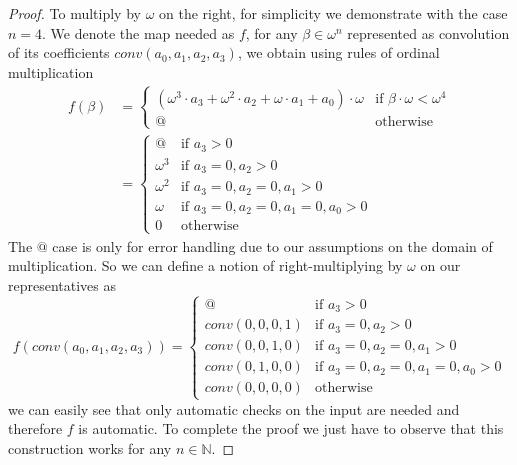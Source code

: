 \documentclass[british,a4paper,]{scrartcl}
\theoremstyle{definition}
\theoremstyle{remark}
\newcommand{\N}{\mathbb{N}}
\begin{document}
\begin{proof}
    To multiply by \(\omega\) on the right, for simplicity we demonstrate with the case \(n=4\).
    We denote the map needed as \(f\),
    for any \(\beta\in \omega^n\) represented as convolution of its coefficients \(conv(a_0,a_1,a_2,a_3)\),
    we obtain using rules of ordinal multiplication
    \begin{align*}
        f(\beta) &=
        \begin{cases}
            \left(\omega^3\cdot a_3 + \omega^2\cdot a_2 + \omega\cdot a_1 + a_0\right)\cdot\omega
            &\text{if } \beta\cdot\omega < \omega^4 \\
            @ &\text{otherwise}
        \end{cases}
        \\
        &= \begin{cases}
            @ &\text{if } a_3>0 \\
            \omega^3 &\text{if } a_3=0, a_2>0 \\
            \omega^2 &\text{if } a_3=0, a_2=0, a_1>0 \\
            \omega &\text{if } a_3=0, a_2=0, a_1=0, a_0>0 \\
            0 &\text{otherwise }
        \end{cases}
    \end{align*}
    The \(@\) case is only for error handling due to our assumptions on the domain of multiplication.
    So we can define a notion of right-multiplying by \(\omega\) on our representatives as
    \[
        f(conv(a_0,a_1,a_2,a_3)) =
        \begin{cases}
            @ &\text{if } a_3>0 \\
            conv(0,0,0,1) &\text{if } a_3=0, a_2>0 \\
            conv(0,0,1,0) &\text{if } a_3=0, a_2=0, a_1>0 \\
            conv(0,1,0,0) &\text{if } a_3=0, a_2=0, a_1=0, a_0>0 \\
            conv(0,0,0,0) &\text{otherwise }
        \end{cases}
    \]
    we can easily see that only automatic checks on the input are needed and therefore \(f\) is automatic.
    To complete the proof we just have to observe that this construction works for any \(n\in\N\).
\end{proof}
\end{document}

